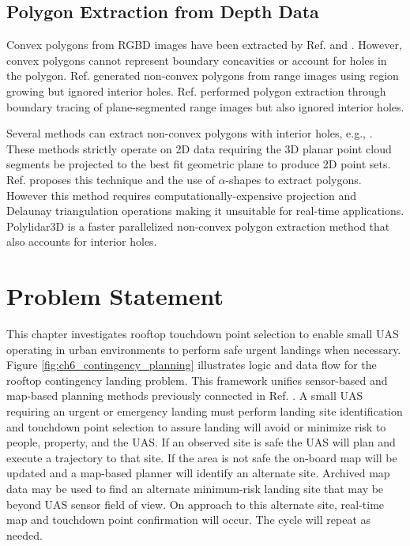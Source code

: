 \subsection{Polygon Extraction from Depth Data}

Convex polygons from RGBD images have been extracted by Ref. \cite{biswas_planar_2012} and \cite{poppinga_fast_2008}.  However, convex polygons cannot represent boundary concavities or account for holes in the polygon. Ref. \cite{lee_indoor_2012-1} generated non-convex polygons from range images using region growing but ignored interior holes. Ref. \cite{trevor2013efficient} performed polygon extraction through boundary tracing of plane-segmented range images but also ignored interior holes.

Several methods can extract non-convex polygons with interior holes, e.g., \cite{edelsbrunner_shape_1983, furieri_spatialite_2017}. These methods strictly operate on 2D data requiring the 3D planar point cloud segments be projected to the best fit geometric plane to produce 2D point sets. Ref. \cite{lee_fast_2013} proposes this technique and the use of $\alpha$-shapes to extract polygons. However this method requires computationally-expensive projection and Delaunay triangulation operations making it unsuitable for real-time applications. Polylidar3D is a faster parallelized non-convex polygon extraction method that also accounts for interior holes.


\section{Problem Statement}\label{sec:ch6_problem_statement}

This chapter investigates rooftop touchdown point selection to enable small UAS operating in urban environments to perform safe urgent landings when necessary. Figure \ref{fig:ch6_contingency_planning} illustrates logic and data flow for the rooftop contingency landing problem. This framework unifies sensor-based and map-based planning methods previously connected  in Ref. \cite{ten_harmsel_emergency_2017}.  A small UAS requiring an urgent or emergency landing must perform landing site identification and touchdown point selection to assure landing will avoid or minimize risk to people, property, and the UAS. If an observed site is safe the UAS will plan and execute a trajectory to that site. If the area is not safe the on-board map will be updated and a map-based planner will identify an alternate site. Archived map data may be used to find an alternate minimum-risk landing site that may be beyond UAS sensor field of view. On approach to this alternate site, real-time map and touchdown point confirmation will occur. The cycle will repeat as needed. 


